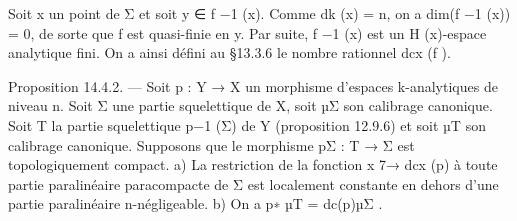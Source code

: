 \documentclass[
  10pt,
]{article}
\newenvironment{Shaded}{}{}
\newcommand{\NormalTok}[1]{#1}
\begin{document}
\begin{Shaded}
\begin{Highlighting}[]
\NormalTok{  Soit x un point de Σ et soit y ∈ f −1 (x). Comme dk (x) = n, on a dim(f −1 (x)) = 0, de}
\NormalTok{sorte que f est quasi{-}finie en y. Par suite, f −1 (x) est un H (x){-}espace analytique fini.}
\NormalTok{On a ainsi défini au §13.3.6 le nombre rationnel dcx (f ).}

\NormalTok{Proposition 14.4.2. — Soit p : Y → X un morphisme d’espaces k{-}analytiques de}
\NormalTok{niveau n. Soit Σ une partie squelettique de X, soit µΣ son calibrage canonique. Soit T la}
\NormalTok{partie squelettique p−1 (Σ) de Y (proposition 12.9.6) et soit µT son calibrage canonique.}
\NormalTok{  Supposons que le morphisme pΣ : T → Σ est topologiquement compact.}
\NormalTok{  a) La restriction de la fonction x 7→ dcx (p) à toute partie paralinéaire paracompacte}
\NormalTok{de Σ est localement constante en dehors d’une partie paralinéaire n{-}négligeable.}
\NormalTok{  b) On a p∗ µT = dc(p)µΣ .}


\end{Highlighting}
\end{Shaded}
\end{document}

